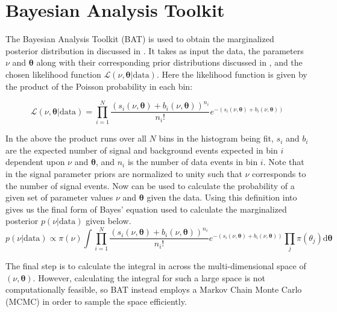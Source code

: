 \section{Bayesian Analysis Toolkit} \label{sec:fit:bat}

The Bayesian Analysis Toolkit (BAT) \cite{Beaujean:2011zz,Beresford:2642397} is
used to obtain the marginalized posterior distribution in 
discussed in .  It takes as input the data, the parameters
$\nu$ and $\boldsymbol{\theta}$ along with their corresponding prior
distributions discussed in , and the chosen likelihood
function $\mathcal{L}(\nu,\boldsymbol{\theta}|\text{data})$.  Here the
likelihood function is given by the product of the Poisson probability in each
bin: 

\begin{equation} \label{sec:fit:likelihood}
\mathcal{L}(\nu,\boldsymbol{\theta}|\text{data}) = \prod_{i=1}^{N} \frac{(s_{i}(\nu,\boldsymbol{\theta}) + b_{i}(\nu,\boldsymbol{\theta}))^{n_{i}}}{n_{i}!} e^{-(s_{i}(\nu,\boldsymbol{\theta}) + b_{i}(\nu,\boldsymbol{\theta}))}
\end{equation}

In the above the product runs over all $N$ bins in the histogram being fit,
$s_{i}$ and $b_{i}$ are the expected number of signal and background events
expected in bin $i$ dependent upon $\nu$ and $\boldsymbol{\theta}$, and $n_{i}$
is the number of data events in bin $i$.  Note that in 
the signal parameter priors are normalized to unity such that $\nu$ corresponds
to the number of signal events. Now  can be used to
calculate the probability of a given set of parameter values $\nu$ and
$\boldsymbol{\theta}$ given the data.  Using this definition into
 gives us the final form of Bayes' equation used to
calculate the marginalized posterior $p(\nu|\text{data})$ given below.
%
\begin{equation} \label{sec:fit:full_bayes}
p(\nu|\text{data}) \propto \pi(\nu) \int \prod_{i=1}^{N} \frac{(s_{i}(\nu,\boldsymbol{\theta}) + b_{i}(\nu,\boldsymbol{\theta}))^{n_{i}}}{n_{i}!} e^{-(s_{i}(\nu,\boldsymbol{\theta}) + b_{i}(\nu,\boldsymbol{\theta}))} \prod_{j}\pi(\theta_j)\text{d}\boldsymbol{\theta}
\end{equation}

The final step is to calculate the integral in  across
the multi-dimensional space of $(\nu,\boldsymbol{\theta})$. However, calculating the
integral for such a large space is not computationally feasible, so BAT instead
employs a Markov Chain Monte Carlo (MCMC) \cite{Betancourt2017ACI,
Beresford:2642397} in order to sample the space efficiently.

